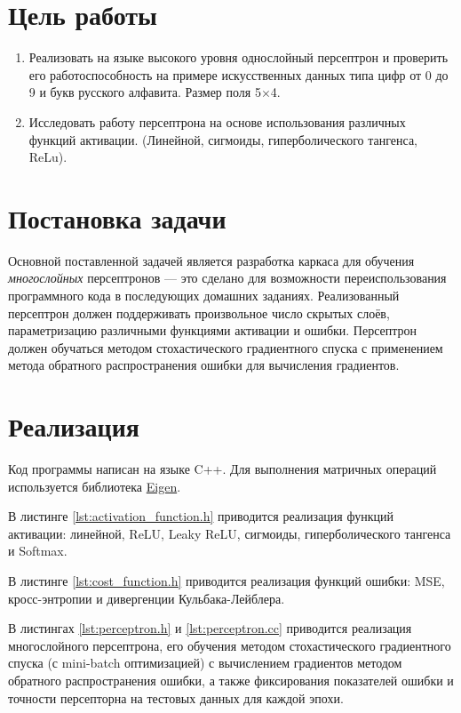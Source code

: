 \documentclass[a4paper, 14pt]{extarticle}
\begin{document}
\renewcommand{\ttdefault}{pcr}

\setlength{\tabcolsep}{3pt}
\newpage
\setcounter{page}{2}

\section{Цель работы}

\begin{enumerate}
  \item Реализовать на языке высокого уровня однослойный персептрон и проверить его работоспособность на примере
    искусственных данных типа цифр от 0 до 9 и букв русского алфавита. Размер поля 5$\times$4. 
  \item Исследовать работу персептрона на основе использования различных функций активации. (Линейной, сигмоиды,
    гиперболического тангенса, ReLu).
\end{enumerate}

\section{Постановка задачи}

Основной поставленной задачей является разработка каркаса для обучения \textit{многослойных} персептронов --- это сделано для возможности
переиспользования программного кода в последующих домашних заданиях. Реализованный персептрон должен поддерживать произвольное число скрытых слоёв,
параметризацию различными функциями активации и ошибки. Персептрон должен обучаться методом стохастического градиентного спуска с применением метода
обратного распространения ошибки для вычисления градиентов.

\section{Реализация}

Код программы написан на языке C++. Для выполнения матричных операций используется библиотека
\href{https://eigen.tuxfamily.org/index.php?title=Main_Page}{Eigen}.

В листинге \ref{lst:activation_function.h} приводится реализация функций активации: линейной, ReLU, Leaky ReLU, сигмоиды, гиперболического
тангенса и Softmax.

В листинге \ref{lst:cost_function.h} приводится реализация функций ошибки: MSE, кросс-энтропии и дивергенции Кульбака-Лейблера.

В листингах \ref{lst:perceptron.h} и \ref{lst:perceptron.cc} приводится реализация многослойного персептрона, его обучения методом стохастического
градиентного спуска (с mini-batch оптимизацией) с вычислением градиентов методом обратного распространения ошибки, а также фиксирования показателей
ошибки и точности персепторна на тестовых данных для каждой эпохи.
\end{document}
